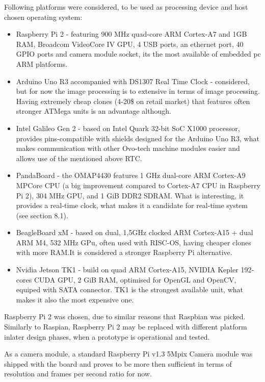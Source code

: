 \documentclass[12pt,twoside,a4paper]{article}
\begin{document}
Following platforms were considered, to be used as processing device and host chosen operating system:

\begin{itemize}
  \item Raspberry Pi 2 - featuring 900 MHz quad-core ARM Cortex-A7 and 1GB RAM, Broadcom VideoCore IV GPU, 4 USB ports, an ethernet port, 40 GPIO ports and camera module socket, its the most available of embedded pc ARM platforms.
  \item Arduino Uno R3 accompanied with DS1307 Real Time Clock - considered, but for now the image processing is to extensive in terms of image processing.
  Having extremely cheap clones (4-20\$ on retail market) that features often stronger ATMega units is an advantage although.
  \item Intel Galileo Gen 2 - based on Intel Quark 32-bit SoC X1000 processor, provides pins-compatible with shields designed for the Arduino Uno R3, what makes communication with other Ovo-tech machine modules easier and allows use of the mentioned above RTC.
  \item PandaBoard - the OMAP4430 features 1 GHz dual-core ARM Cortex-A9 MPCore CPU (a big improvement compared to Cortex-A7 CPU in Raspberry Pi 2), 304 MHz GPU, and 1 GiB DDR2 SDRAM.
  What is interesting, it provides a real-time clock, what makes it a candidate for real-time system (see section 8.1).
  \item BeagleBoard xM - based on dual, 1,5GHz clocked ARM Cortex-A15  + dual ARM M4, 532 MHz GPu, often used with RISC-OS, having cheaper clones with more RAM.It is considered a stronger Raspberry Pi alternative.
  \item Nvidia Jetson TK1 - build on quad ARM Cortex-A15, NVIDIA Kepler 192-cores CUDA GPU, 2 GiB RAM, optimised for OpenGL and OpenCV, equiped with SATA connector.
  TK1 is the strongest available unit, what makes it also the most expensive one.
\end{itemize}

Raspberry Pi 2 was chosen, due to similar reasons that Raspbian was picked.
Similarly to Raspian, Raspberry Pi 2 may be replaced with different platform inlater design phases, when a prototype is operational and tested.

As a camera module, a standard Raspberry Pi v1.3 5Mpix Camera module was shipped with the board and proves to be more then sufficient in terms of resolution and frames per second ratio for now.
\end{document}
